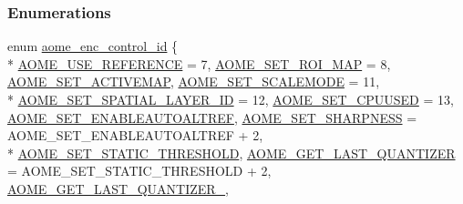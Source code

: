 \subsubsection*{Enumerations}
\begin{DoxyCompactItemize}
\item 
enum \hyperlink{group__aom__encoder_gae78dde67a6d78f332e9bdba0dde42db5}{aome\+\_\+enc\+\_\+control\+\_\+id} \{ \\*
\hyperlink{group__aom__encoder_ggae78dde67a6d78f332e9bdba0dde42db5a1fd179ef74229c4b1a438521eb4ab1e4}{A\+O\+M\+E\+\_\+\+U\+S\+E\+\_\+\+R\+E\+F\+E\+R\+E\+N\+CE} = 7, 
\hyperlink{group__aom__encoder_ggae78dde67a6d78f332e9bdba0dde42db5a274f8b560c2ecc4d03e553071e89a7a4}{A\+O\+M\+E\+\_\+\+S\+E\+T\+\_\+\+R\+O\+I\+\_\+\+M\+AP} = 8, 
\hyperlink{group__aom__encoder_ggae78dde67a6d78f332e9bdba0dde42db5a709937e1e0eb160e49720e6fd5164d1e}{A\+O\+M\+E\+\_\+\+S\+E\+T\+\_\+\+A\+C\+T\+I\+V\+E\+M\+AP}, 
\hyperlink{group__aom__encoder_ggae78dde67a6d78f332e9bdba0dde42db5acc51e9ced332c76d1721a0a477500b03}{A\+O\+M\+E\+\_\+\+S\+E\+T\+\_\+\+S\+C\+A\+L\+E\+M\+O\+DE} = 11, 
\\*
\hyperlink{group__aom__encoder_ggae78dde67a6d78f332e9bdba0dde42db5aac7fbd0de7295387d7821f1889c47790}{A\+O\+M\+E\+\_\+\+S\+E\+T\+\_\+\+S\+P\+A\+T\+I\+A\+L\+\_\+\+L\+A\+Y\+E\+R\+\_\+\+ID} = 12, 
\hyperlink{group__aom__encoder_ggae78dde67a6d78f332e9bdba0dde42db5adac09e1a8da079b08fca5ccbf981f1a6}{A\+O\+M\+E\+\_\+\+S\+E\+T\+\_\+\+C\+P\+U\+U\+S\+ED} = 13, 
\hyperlink{group__aom__encoder_ggae78dde67a6d78f332e9bdba0dde42db5ac8a24393f214823f5a6bd345afb840b6}{A\+O\+M\+E\+\_\+\+S\+E\+T\+\_\+\+E\+N\+A\+B\+L\+E\+A\+U\+T\+O\+A\+L\+T\+R\+EF}, 
\hyperlink{group__aom__encoder_ggae78dde67a6d78f332e9bdba0dde42db5a0df0d30e82bb9683f3131138dfa2949a}{A\+O\+M\+E\+\_\+\+S\+E\+T\+\_\+\+S\+H\+A\+R\+P\+N\+E\+SS} = A\+O\+M\+E\+\_\+\+S\+E\+T\+\_\+\+E\+N\+A\+B\+L\+E\+A\+U\+T\+O\+A\+L\+T\+R\+EF + 2, 
\\*
\hyperlink{group__aom__encoder_ggae78dde67a6d78f332e9bdba0dde42db5aa4f58f6a86b710e403daeac055738111}{A\+O\+M\+E\+\_\+\+S\+E\+T\+\_\+\+S\+T\+A\+T\+I\+C\+\_\+\+T\+H\+R\+E\+S\+H\+O\+LD}, 
\hyperlink{group__aom__encoder_ggae78dde67a6d78f332e9bdba0dde42db5acf37709a88970e0dffb961d951fd43a0}{A\+O\+M\+E\+\_\+\+G\+E\+T\+\_\+\+L\+A\+S\+T\+\_\+\+Q\+U\+A\+N\+T\+I\+Z\+ER} = A\+O\+M\+E\+\_\+\+S\+E\+T\+\_\+\+S\+T\+A\+T\+I\+C\+\_\+\+T\+H\+R\+E\+S\+H\+O\+LD + 2, 
\hyperlink{group__aom__encoder_ggae78dde67a6d78f332e9bdba0dde42db5a17b924cadd3c942f9e57fe6fc4d5e2ab}{A\+O\+M\+E\+\_\+\+G\+E\+T\+\_\+\+L\+A\+S\+T\+\_\+\+Q\+U\+A\+N\+T\+I\+Z\+E\+R\+\_}, 

\end{DoxyCompactItemize}
